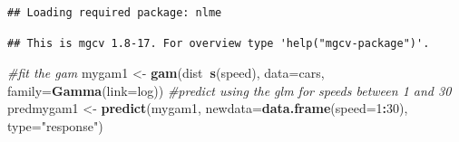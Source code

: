 \documentclass[]{book}
\newenvironment{Shaded}{\begin{snugshade}}{\end{snugshade}}
\newcommand{\KeywordTok}[1]{\textcolor[rgb]{0.13,0.29,0.53}{\textbf{#1}}}
\newcommand{\DataTypeTok}[1]{\textcolor[rgb]{0.13,0.29,0.53}{#1}}
\newcommand{\DecValTok}[1]{\textcolor[rgb]{0.00,0.00,0.81}{#1}}
\newcommand{\StringTok}[1]{\textcolor[rgb]{0.31,0.60,0.02}{#1}}
\newcommand{\CommentTok}[1]{\textcolor[rgb]{0.56,0.35,0.01}{\textit{#1}}}
\newcommand{\OperatorTok}[1]{\textcolor[rgb]{0.81,0.36,0.00}{\textbf{#1}}}
\newcommand{\NormalTok}[1]{#1}
\theoremstyle{definition}
\theoremstyle{definition}
\theoremstyle{remark}
\begin{document}
\begin{verbatim}
## Loading required package: nlme
\end{verbatim}

\begin{verbatim}
## This is mgcv 1.8-17. For overview type 'help("mgcv-package")'.
\end{verbatim}

\begin{Shaded}
\begin{Highlighting}[]
\CommentTok{#fit the gam}
\NormalTok{mygam1 <-}\StringTok{ }\KeywordTok{gam}\NormalTok{(dist}\OperatorTok{~}\KeywordTok{s}\NormalTok{(speed), }\DataTypeTok{data=}\NormalTok{cars, }\DataTypeTok{family=}\KeywordTok{Gamma}\NormalTok{(}\DataTypeTok{link=}\NormalTok{log))}
\CommentTok{#predict using the glm for speeds between 1 and 30}
\NormalTok{predmygam1 <-}\StringTok{ }\KeywordTok{predict}\NormalTok{(mygam1, }\DataTypeTok{newdata=}\KeywordTok{data.frame}\NormalTok{(}\DataTypeTok{speed=}\DecValTok{1}\OperatorTok{:}\DecValTok{30}\NormalTok{), }\DataTypeTok{type=}\StringTok{"response"}\NormalTok{)}
\end{Highlighting}
\end{Shaded}

\begin{Shaded}
\end{Shaded}
\end{document}
